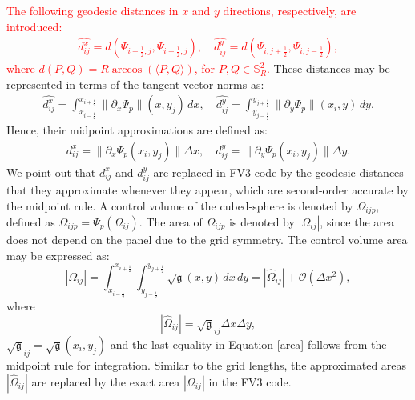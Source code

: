 \documentclass[preprint,12pt]{elsarticle}
\begin{document}
\begin{linenumbers}
\textcolor{red}{
The following geodesic distances in $x$ and $y$ directions, respectively, are introduced:
\begin{align}
	\label{distcube}
	\widehat{d^x_{ij}} = d(\Psi_{i+\frac{1}{2},j},\Psi_{i-\frac{1}{2},j}) , \quad
	\widehat{d^y_{ij}} = d(\Psi_{i,j+\frac{1}{2}},\Psi_{i,j-\frac{1}{2}}),
\end{align}
where $d(P,Q) = R\arccos{(\langle P, Q \rangle)}$, for $P,Q \in \mathbb{S}^2_R$.}
These distances may be represented in terms of the tangent vector norms as:
\begin{align}
	\widehat{d^x_{ij}} = 
	\int_{x_{i-\frac{1}{2}}}^{x_{i+\frac{1}{2}}}
	\|\partial_x  {\Psi}_{p}\|(x,y_j) \,dx ,\quad
	\widehat{d^y_{ij}} =
	\int_{y_{j-\frac{1}{2}}}^{y_{j+\frac{1}{2}}}
	\|\partial_y {\Psi}_{p}\|(x_i,y) \,dy.
\end{align}
Hence, their midpoint approximations are defined as:
\begin{align}
	\label{distcube2}
	{d^x_{ij}} = \|\partial_x {\Psi}_{p}(x_i,y_j)  \|\Delta x,\quad
	{d^y_{ij}} = \|\partial_y {\Psi}_{p}(x_i,y_j) \|\Delta y.
\end{align}
We point out that ${d^x_{ij}}$ and ${d^y_{ij}}$ are replaced in FV3 code by the geodesic distances that they approximate whenever they appear, which are second-order accurate by the midpoint rule.
A control volume of the cubed-sphere is denoted by $\Omega_{ijp}$, defined as $\Omega_{ijp} = {\Psi}_p(\Omega_{ij})$.
The area of $\Omega_{ijp}$ is denoted by $|\Omega_{ij}|$,
since the area does not depend on the panel due to the grid symmetry.
The control volume area may be expressed as:
\begin{equation}
	\label{area}
	|\Omega_{ij}| = \int_{x_{i-\frac{1}{2}}}^{x_{i+\frac{1}{2}}} \int_{y_{j-\frac{1}{2}}}^{y_{j+\frac{1}{2}}}{\sqrt{\mathfrak{g}}(x,y)} \,dx \,dy = 
	|\hat{\Omega}_{ij}| + \mathcal{O}(\Delta x^2),
\end{equation}
where 
\begin{equation}
	\label{area2}
	|\hat{\Omega}_{ij}| = \sqrt{\mathfrak{g}}_{ij} \Delta x \Delta y,
\end{equation} $\sqrt{\mathfrak{g}}_{ij}=\sqrt{\mathfrak{g}}(x_i,y_j) $
and the last equality in Equation \eqref{area} follows from the midpoint rule for integration.
Similar to the grid lengths, the approximated areas $|\hat{\Omega}_{ij}|$ are replaced by the exact area $|\Omega_{ij}|$ in the FV3 code.
\begin{table}[htbp]
	\centering

\end{table}
\end{linenumbers}
\end{document}
